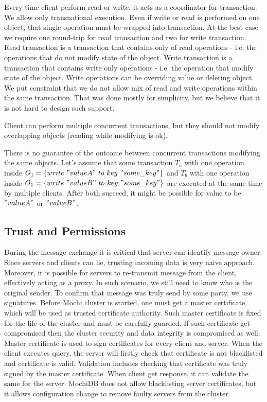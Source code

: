 \documentclass[letterpaper,twocolumn,10pt]{article}
\begin{document}
Every time client perform read or write, it acts as a coordinator for transaction. We allow only transnational execution. Even if write or read is performed on one object, that single operation must be wrapped into transaction. At the best case we require one round-trip for read transaction and two for write transaction. Read transaction is a transaction that contains only of read operations - i.e. the operations that do not modify state of the object. Write transaction is a transaction that contains write only operations - i.e. the operation that modify state of the object. Write operations can be overriding value or deleting object. We put constraint that we do not allow mix of read and write operations within the same transaction. That was done mostly for simplicity, but we believe that it is not hard to design such support.

Client can perform multiple concurrent transactions, but they should not modify overlapping objects (reading while modifying is ok).

There is no guarantee of the outcome between concurrent transactions modifying the same objects. Let's assume that some transaction $T_{a}$ with one operation inside $O_{1} = \{write\ "valueA"\ to\ key\ "some\_key" \}$ and $T_{b}$ with one operation inside $O_{1} = \{write\ "valueB"\ to\ key\ "some\_key" \}$ are executed at the same time by multiple clients. After both succeed, it might be possible for value to be $"valueA"$ or $"valueB"$.

\subsection{Trust and Permissions}

During the message exchange it is critical that server can identify message owner. Since servers and clients can lie, trusting incoming data is very naive approach. Moreover, it is possible for servers to re-transmit message from the client, effectively acting as a proxy. In such scenario, we still need to know who is the original sender. To confirm that message was truly send by some party, we use signatures.
Before Mochi cluster is started, one must get a master certificate which will be used as trusted certificate authority. Such master certificate is fixed for the life of the cluster and must be carefully guarded. If such certificate get compromised then the cluster security and data integrity is compromised as well. 
Master certificate is used to sign certificates for every client and server. When the client executes query, the server will firstly check that certificate is not blacklisted and certificate is valid. Validation includes checking that certificate was truly signed by the master certificate. When client get response, it can validate the same for the server. MochiDB does not allow blacklisting server certificates, but it allows configuration change to remove faulty servers from the cluster.
\end{document}
